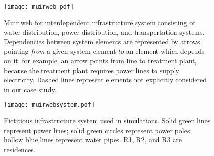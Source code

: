 
\begin{landscape}

\vspace*{\fill}

\begin{figure}[!htp]
\centerline{\texttt{[image: muirweb.pdf]}}
\caption[Muir web for interdependent infrastructure system.]{\label{fig:ch4:muirweb}Muir web for interdependent infrastructure system consisting of water distribution, power distribution, and transportation systems. Dependencies between system elements are represented by arrows pointing \textit{from} a given system element \textit{to} an element which depends on it; for example, an arrow points from line to treatment plant, because the treatment plant requires power lines to supply electricity. Dashed lines represent elements not explicitly considered in our case study.}
\end{figure}

\vspace*{\fill}

\end{landscape}



\begin{landscape}

\vspace*{\fill}

\begin{figure}[!htp]
\centerline{\texttt{[image: muirwebsystem.pdf]}}
\caption[Fictitious infrastructure system used in simulations.]{\label{fig:ch4:infrastructures}Fictitious infrastructure system used in simulations.  Solid green lines represent power lines; solid green circles represent power poles; hollow blue lines represent water pipes. R1, R2, and R3 are residences.}
\end{figure}

\vspace*{\fill}

\end{landscape}


